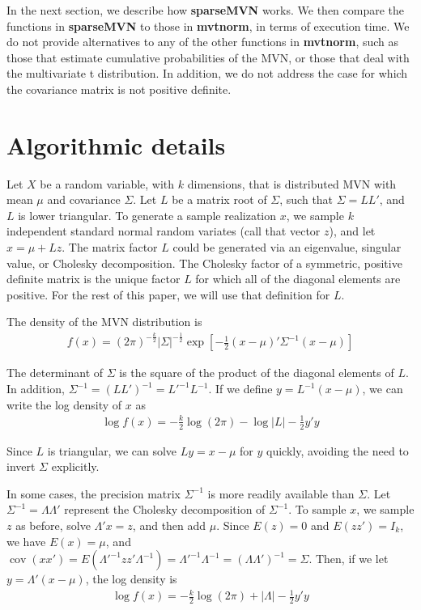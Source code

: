 \documentclass[11pt]{article}
\newcommand{\pkg}[1]{\textbf{#1}}
\DeclareMathOperator\cov{cov}
\begin{document}
In the next section, we describe how \pkg{sparseMVN} works.  We then compare the functions in \pkg{sparseMVN} to those in \pkg{mvtnorm}, in terms of execution time.  We do not provide alternatives to any of the other functions in \pkg{mvtnorm}, such as those that estimate cumulative probabilities of the MVN, or those that deal with the multivariate t distribution.  In addition, we do not address the case for which the covariance matrix is not positive definite.

\section{Algorithmic details}

Let $X$ be a random variable, with $k$ dimensions, that is distributed MVN with mean $\mu$ and covariance $\Sigma$.  Let $L$ be a matrix root of $\Sigma$, such that $\Sigma=LL'$, and $L$ is lower triangular. To generate a sample realization $x$, we sample $k$ independent standard normal random variates (call that vector $z$), and let $x=\mu+Lz$.  The matrix factor $L$ could be generated via an eigenvalue, singular value, or Cholesky decomposition.  The Cholesky factor of a symmetric, positive definite matrix is the unique factor $L$ for which all of the diagonal elements are positive.  For the rest of this paper, we will use that definition for $L$.

The density of the MVN distribution is
\begin{align}
  \label{eq:MVNdens}  f(x)=(2\pi)^{-\frac{k}{2}}|\Sigma|^{-\frac{1}{2}}\exp\left[-\frac{1}{2}\left(x-\mu\right)'\Sigma^{-1}\left(x-\mu\right)\right]
\end{align}

The determinant of $\Sigma$ is the square of the product of the diagonal elements of $L$.  In addition, $\Sigma^{-1}=(LL')^{-1}=L'^{-1}L^{-1}$.  If we define $y=L^{-1}(x-\mu)$, we can write the log density of $x$ as
\begin{align}
  \label{eq:logDens1}
  \log f(x)=-\frac{k}{2}\log(2\pi)-\log|L|-\frac{1}{2}y'y
\end{align}

Since $L$ is triangular, we can solve $Ly=x-\mu$ for $y$ quickly, avoiding the need to invert $\Sigma$ explicitly.

In some cases, the precision matrix $\Sigma^{-1}$ is more readily available than $\Sigma$.  Let $\Sigma^{-1}=\Lambda\Lambda'$ represent the Cholesky decomposition of $\Sigma^{-1}$.  To sample $x$, we sample $z$ as before, solve $\Lambda'x=z$, and then add $\mu$.  Since $E(z)=0$ and $E(zz')=I_k$, we have $E(x)=\mu$, and $\cov(xx')=E(\Lambda'^{-1}zz'\Lambda^{-1})=\Lambda'^{-1}\Lambda^{-1}=(\Lambda\Lambda')^{-1}=\Sigma$.  Then, if we let $y=\Lambda'(x-\mu)$, the log density is 
\begin{align}
  \label{eq:logDens2}
  \log f(x)=-\frac{k}{2}\log(2\pi)+|\Lambda|-\frac{1}{2}y'y
\end{align}
\end{document}
